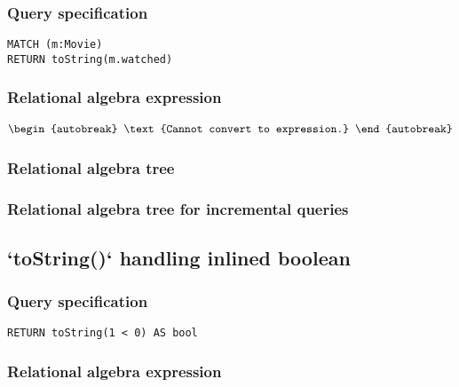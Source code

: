 \subsubsection*{Query specification}

\begin{lstlisting}
MATCH (m:Movie)
RETURN toString(m.watched)
\end{lstlisting}

\subsubsection*{Relational algebra expression}

\begin{align*}
\begin{autobreak}
\text{Cannot convert to expression.}
\end{autobreak}
\end{align*}

\subsubsection*{Relational algebra tree}


\subsubsection*{Relational algebra tree for incremental queries}


\subsection{`toString()` handling inlined boolean}

\subsubsection*{Query specification}

\begin{lstlisting}
RETURN toString(1 < 0) AS bool
\end{lstlisting}

\subsubsection*{Relational algebra expression}

